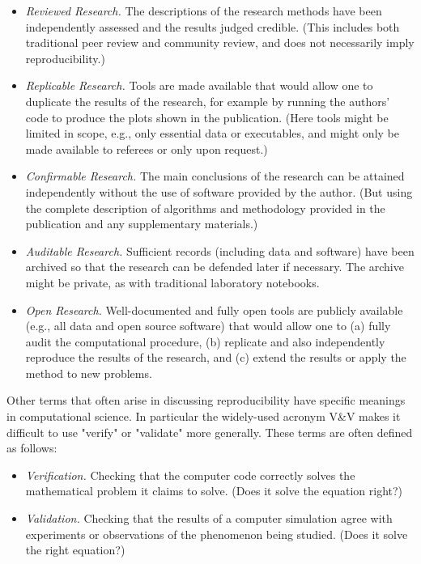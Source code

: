 \documentclass[11pt]{article}
\begin{document}
\begin{itemize} 
\item {\em Reviewed Research.} The descriptions of the research methods have been
independently assessed and the results judged credible. (This includes both
traditional peer review and community review, and does not necessarily imply
reproducibility.)

\item {\em Replicable Research.}  Tools are made available that would allow one to
duplicate the results of the research, for example by running the authors'
code to produce the plots shown in the publication. (Here tools might be
limited in scope, e.g., only essential data or executables, and might only
be made available to referees or only upon request.)

\item {\em Confirmable Research.} The main conclusions of the research can be attained
independently without the use of software provided by the author. (But using
the complete description of algorithms and methodology provided in the
publication and any supplementary materials.)

\item {\em Auditable Research.}  Sufficient records (including data and software) have
been archived so that the research can be defended later if necessary.  The
archive might be private, as with traditional laboratory notebooks.

\item {\em Open Research.}  Well-documented and fully open tools are publicly available
(e.g., all data and open source software) that would allow one to (a) fully
audit the computational procedure, (b) replicate and also independently
reproduce the results of the research, and 
(c) extend the results or apply the method to new problems.

\end{itemize} 


Other terms that often arise in discussing reproducibility have specific
meanings in computational science.  In particular the widely-used acronym
V\&V makes it difficult to use "verify" or "validate" more generally.  These
terms are often defined as follows: 

\begin{itemize} 
\item {\em Verification.}  Checking that the computer code correctly solves the
mathematical problem it claims to solve. (Does it solve the equation right?)

\item {\em Validation.}  Checking that the results of a computer simulation agree with
experiments or observations of the phenomenon being studied.  (Does it solve
the right equation?)
\end{itemize} 
\end{document}
